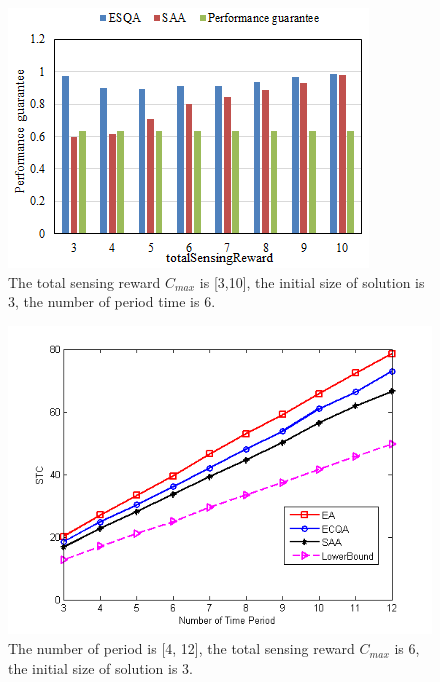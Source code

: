 \documentclass[journal]{IEEEtran}
\begin{document}
\begin{figure}
	\centering
	\includegraphics[width=1\linewidth]{Fig4(b).png}
	\caption{The total sensing reward $C_{max}$ is [3,10], the initial size of solution is 3, the number of period time is 6.}
	\label{fig:figure6}
\end{figure}
\begin{figure}
	\centering
	\includegraphics[width=1\linewidth]{Fig4(c).png}
	\caption{ The number of period is [4, 12], the total sensing reward $C_{max}$ is 6, the initial size of solution is 3.}
	\label{fig:figure5}
\end{figure}
\end{document}
